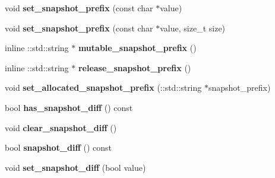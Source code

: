 \begin{DoxyCompactItemize}
\item 
\mbox{\label{classcaffe_1_1_solver_parameter_a6058300e697111e7f42401ef72eb0fee}} 
void {\bfseries set\+\_\+snapshot\+\_\+prefix} (const char $\ast$value)
\item 
\mbox{\label{classcaffe_1_1_solver_parameter_adc228bdc60b61a8f9c821317edd61425}} 
void {\bfseries set\+\_\+snapshot\+\_\+prefix} (const char $\ast$value, size\+\_\+t size)
\item 
\mbox{\label{classcaffe_1_1_solver_parameter_a4ef0706260f3b1ebdf866d4a7045cf6b}} 
inline \+::std\+::string $\ast$ {\bfseries mutable\+\_\+snapshot\+\_\+prefix} ()
\item 
\mbox{\label{classcaffe_1_1_solver_parameter_a854af5f83894d9f14266b91f68e118e2}} 
inline \+::std\+::string $\ast$ {\bfseries release\+\_\+snapshot\+\_\+prefix} ()
\item 
\mbox{\label{classcaffe_1_1_solver_parameter_ae6d265b250b550f74d40cf728c329f05}} 
void {\bfseries set\+\_\+allocated\+\_\+snapshot\+\_\+prefix} (\+::std\+::string $\ast$snapshot\+\_\+prefix)
\item 
\mbox{\label{classcaffe_1_1_solver_parameter_a55204b8a8f5018e2b716d9c15e3eb099}} 
bool {\bfseries has\+\_\+snapshot\+\_\+diff} () const
\item 
\mbox{\label{classcaffe_1_1_solver_parameter_aa4978bfe5913c72f33dd68fb3e89ed20}} 
void {\bfseries clear\+\_\+snapshot\+\_\+diff} ()
\item 
\mbox{\label{classcaffe_1_1_solver_parameter_a226e5f9191d962477c17483875df574e}} 
bool {\bfseries snapshot\+\_\+diff} () const
\item 
\mbox{\label{classcaffe_1_1_solver_parameter_ab46e9ce3029d671fc7747caf60304833}} 
void {\bfseries set\+\_\+snapshot\+\_\+diff} (bool value)
\item 
\mbox{\label{classcaffe_1_1_solver_parameter_a5c4feaa6e2c39bc1fe9cd6fdbc0f800b}} 

\end{DoxyCompactItemize}

